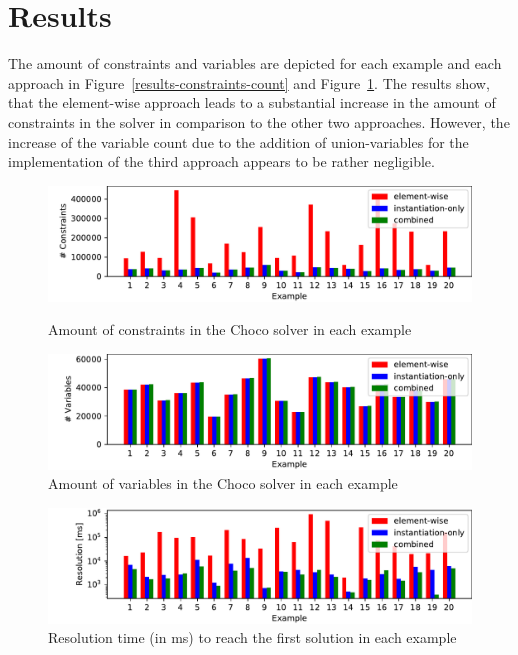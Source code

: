 \documentclass[english,biblatex]{lni}
\begin{document}
\section{Results}

The amount of constraints and variables are depicted for each example and each approach in Figure~\ref{results-constraints-count} and Figure~\ref{results-variables-count}.
The results show, that the element-wise approach leads to a substantial increase in the amount of constraints in the solver in comparison to the other two approaches.
However, the increase of the variable count due to the addition of union-variables for the implementation of the third approach appears to be rather negligible.

\begin{figure}[h!tbp]
\centering
\includegraphics[width=\textwidth]{results-constraint-count}
\caption{Amount of constraints in the Choco solver in each example}
\label{results-constraints-count}
\vspace*{\floatsep}
\includegraphics[width=\textwidth]{results-variables-count}
\caption{Amount of variables in the Choco solver in each example}
\label{results-variables-count}
\end{figure}

\begin{figure}[h!tbp]
\centering
\includegraphics[width=\textwidth]{results-resolution}
\caption{Resolution time (in ms) to reach the first solution in each example}
\label{results-resolution}
\end{figure}
\end{document}
